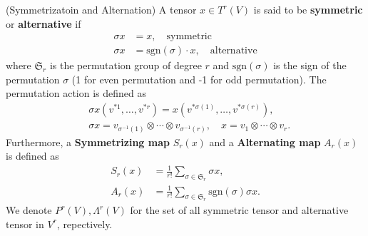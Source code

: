 \begin{definition}(Symmetrizatoin and Alternation)
A tensor $x\in T^r(V)$ is said to be \textbf{symmetric} or \textbf{alternative} if 
\begin{equation}
\begin{aligned}
\sigma x &= x,\quad\text{symmetric}\\ 
\sigma x &= \text{sgn}(\sigma)\cdot x,\quad \text{alternative}
\end{aligned}
\end{equation}
where $\mathfrak{S}_r$ is the permutation group of degree $r$ and $\text{sgn}(\sigma)$ is the sign of the permutation $\sigma$ (1 for even permutation and -1 for odd permutation). The permutation action is defined as
\begin{equation}
\begin{aligned}
&\sigma x(v^{*1},\dots,v^{*r})=x\left(v^{*\sigma(1)},\dots,v^{*\sigma(r)}\right),\\
&\sigma x=v_{\sigma^{-1}(1)}\otimes\cdots\otimes v_{\sigma^{-1}(r)},\quad x=v_1\otimes\cdots\otimes v_r.
\label{eq:tensor_permute}
\end{aligned}
\end{equation}
Furthermore, a \textbf{Symmetrizing map} $S_r(x)$ and a \textbf{Alternating map} $A_r(x)$ is defined as
\begin{equation}
\begin{aligned}
S_r(x)&=\frac{1}{r!}\sum_{\sigma\in\mathfrak{S}_r}\sigma x,\\
A_r(x)&=\frac{1}{r!}\sum_{\sigma\in\mathfrak{S}_r}\text{sgn}(\sigma)\sigma x.
\end{aligned}
\end{equation}
We denote $P^r(V),\Lambda^r(V)$ for the set of all symmetric tensor and alternative tensor in $V^r$, repectively.
\end{definition}

